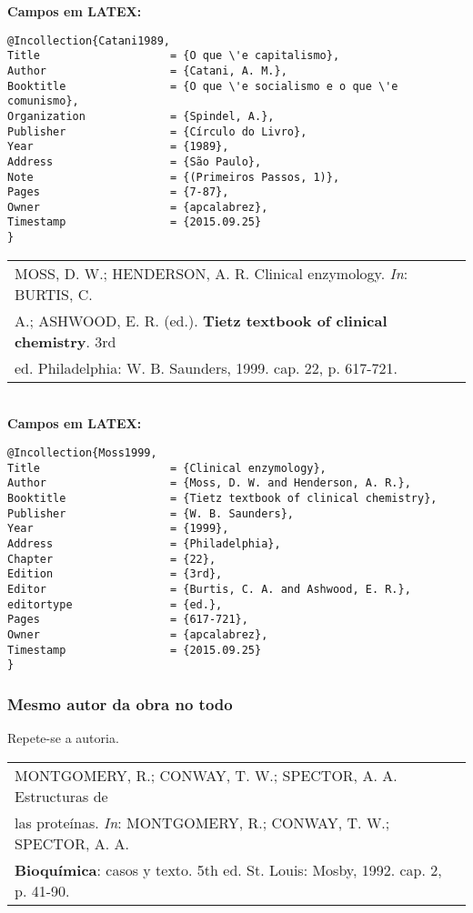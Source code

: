 \textbf{Campos em LATEX:} 

\begin{verbatim}
@Incollection{Catani1989,
Title                    = {O que \'e capitalismo},
Author                   = {Catani, A. M.},
Booktitle                = {O que \'e socialismo e o que \'e comunismo},
Organization             = {Spindel, A.},
Publisher                = {Círculo do Livro},
Year                     = {1989},
Address                  = {São Paulo},
Note                     = {(Primeiros Passos, 1)},
Pages                    = {7-87},
Owner                    = {apcalabrez},
Timestamp                = {2015.09.25}
}
\end{verbatim}


\begin{tabular}{|l|c|} \hline
	MOSS, D. W.; HENDERSON, A. R. Clinical enzymology. \textit{In}: BURTIS, C. \\A.; ASHWOOD, E. R. (ed.). \textbf{Tietz textbook of clinical chemistry}. 3rd\\ ed. Philadelphia: W. B. Saunders, 1999. cap. 22, p. 617-721.  \\\hline
\end{tabular} \\

\textbf{Campos em LATEX:} 

\begin{verbatim}
@Incollection{Moss1999,
Title                    = {Clinical enzymology},
Author                   = {Moss, D. W. and Henderson, A. R.},
Booktitle                = {Tietz textbook of clinical chemistry},
Publisher                = {W. B. Saunders},
Year                     = {1999},
Address                  = {Philadelphia},
Chapter                  = {22},
Edition                  = {3rd},
Editor                   = {Burtis, C. A. and Ashwood, E. R.},
editortype               = {ed.},
Pages                    = {617-721},
Owner                    = {apcalabrez},
Timestamp                = {2015.09.25}
}
\end{verbatim}

\subsubsection{Mesmo autor da obra no todo}

Repete-se a autoria. \\

\begin{tabular}{|l|c|} \hline
	MONTGOMERY, R.; CONWAY, T. W.; SPECTOR, A. A. Estructuras de \\las proteínas.  \textit{In}: MONTGOMERY, R.; CONWAY, T. W.; SPECTOR, A. A. \\
	\textbf{Bioquímica}: casos y texto. 5th ed. St. Louis:
	Mosby, 1992. cap. 2, p. 41-90.  \\\hline
\end{tabular} \\ 

